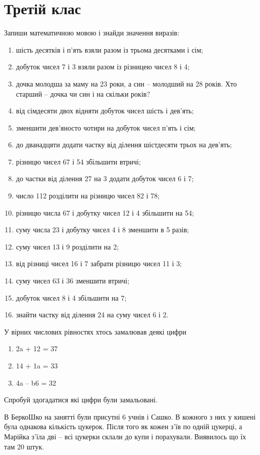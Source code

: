 \chapter{Третій клас}

\problem
Запиши математичною мовою і знайди значення виразів:
\begin{enumerate}
    \item шість десятків і п'ять взяли разом із трьома десятками і сім;
    \item добуток чисел 7 і 3 взяли разом із різницею чисел 8 і 4;
    \item дочка молодша за маму на 23 роки, а син – молодший на 28 років.
    Хто старший – дочка чи син і на скільки років?
    \item від сімдесяти двох відняти добуток чисел шість і дев'ять;
    \item зменшити дев'яносто чотири на добуток чисел п'ять і сім;
    \item до дванадцяти додати частку від ділення шістдесяти трьох на дев'ять;
    \item різницю чисел 67 і 54 збільшити втричі;
    \item до частки від ділення 27 на 3 додати добуток чисел 6 і 7;
    \item число 112 розділити на різницю чисел 82 і 78;
    \item різницю числа 67 і добутку чисел 12 і 4 збільшити на 54;
    \item суму числа 23 і добутку чисел 4 і 8 зменшити в 5 разів;
    \item суму чисел 13 і 9 розділити на 2;
    \item від різниці чисел 16 і 7 забрати різницю чисел 11 і 3;
    \item суму чисел 63 і 36 зменшити втричі;
    \item добуток чисел 8 і 4 збільшити на 7;
    \item знайти частку від ділення 24 на суму чисел 6 і 2.
\end{enumerate}


\problem
У вірних числових рівностях хтось замалював деякі цифри
\begin{enumerate}
    \item 2a + 12 = 37
    \item 14 + 1a = 33
    \item 4a – b6 = 32
\end{enumerate}
Спробуй здогадатися які цифри були замальовані.


\problem
В БеркоШко на занятті були присутні 6 учнів і Сашко.
В кожного з них у кишені була однакова кількість цукерок.
Після того як кожен з'їв по одній цукерці,
а Марійка з'їла дві – всі цукерки склали до купи і порахували.
Виявилось що їх там 20 штук.

